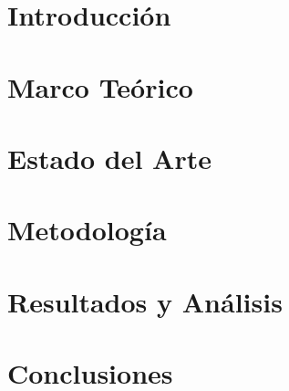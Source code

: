\documentclass[
	spanish, %
	letterpaper, oneside
]{book}
\begin{document}
\templateIndex

\templateFinalcfg


\chapter{Introducción}



\newpage
\chapter{Marco Teórico}



\chapter{Estado del Arte}



\newpage
\chapter{Metodología}



\newpage 
\chapter{Resultados y Análisis}



\newpage
\chapter{Conclusiones}





\newpage





\end{document}
